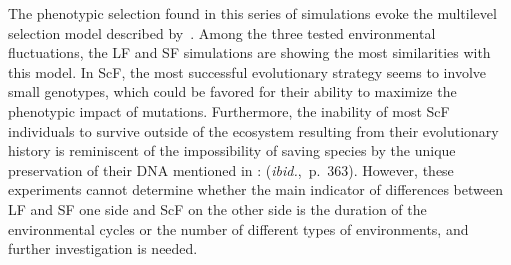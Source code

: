 

The phenotypic selection found in this series of simulations evoke the multilevel selection model described by~\citet{jablonka2014evolution}. Among the three tested environmental fluctuations, the LF and SF simulations are showing the most similarities with this model. In ScF, the most successful evolutionary strategy seems to involve small genotypes, which could be favored for their ability to maximize the phenotypic impact of mutations. Furthermore, the inability of most ScF individuals to survive outside of the ecosystem resulting from their evolutionary history is reminiscent of the impossibility of saving species by the unique preservation of their DNA mentioned in \cite{jablonka2014evolution}:  (\emph{ibid.},~p.~363). However, these experiments cannot determine whether the main indicator of differences between LF and SF one side and ScF on the other side is the duration of the environmental cycles or the number of different types of environments, and further investigation is needed.



